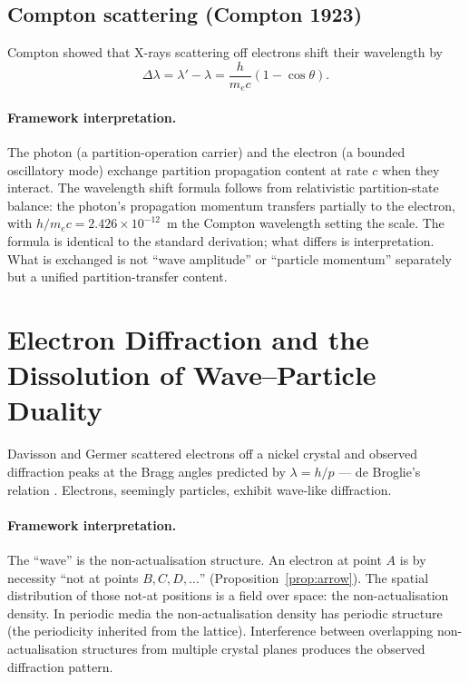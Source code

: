 \documentclass[11pt,a4paper]{article}
\theoremstyle{definition}
\theoremstyle{remark}
\begin{document}
\subsection{Compton scattering (Compton 1923)}

Compton \citep{compton1923} showed that X-rays scattering off electrons shift their wavelength by
\[
\Delta\lambda = \lambda' - \lambda = \frac{h}{m_e c}(1 - \cos\theta).
\]

\paragraph{Framework interpretation.} The photon (a partition-operation carrier) and the electron (a bounded oscillatory mode) exchange partition propagation content at rate $c$ when they interact. The wavelength shift formula follows from relativistic partition-state balance: the photon's propagation momentum transfers partially to the electron, with $h/m_e c = 2.426\times 10^{-12}$~m the Compton wavelength setting the scale. The formula is identical to the standard derivation; what differs is interpretation. What is exchanged is not ``wave amplitude'' or ``particle momentum'' separately but a unified partition-transfer content.

\section{Electron Diffraction and the Dissolution of Wave--Particle Duality}
\label{sec:diffraction}

Davisson and Germer \citep{davissongermer1927} scattered electrons off a nickel crystal and observed diffraction peaks at the Bragg angles predicted by $\lambda = h/p$ --- de Broglie's relation \citep{deBroglie1924}. Electrons, seemingly particles, exhibit wave-like diffraction.

\paragraph{Framework interpretation.} The ``wave'' is the non-actualisation structure. An electron at point $A$ is by necessity ``not at points $B, C, D, \dots$'' (Proposition~\ref{prop:arrow}). The spatial distribution of those not-at positions is a field over space: the non-actualisation density. In periodic media the non-actualisation density has periodic structure (the periodicity inherited from the lattice). Interference between overlapping non-actualisation structures from multiple crystal planes produces the observed diffraction pattern.
\end{document}
